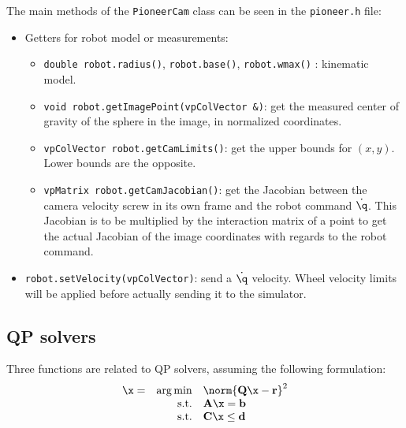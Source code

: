 \documentclass{ecnreport}
\begin{document}
The main methods of the \texttt{PioneerCam} class can be seen in the \texttt{pioneer.h} file:
\begin{itemize}
 \item Getters for robot model or measurements:
 \begin{itemize}
  \item \texttt{double robot.radius()}, \texttt{robot.base()}, \texttt{robot.wmax()} : kinematic model.
  \item \texttt{void robot.getImagePoint(vpColVector \&)}: get the measured center of gravity of the sphere in the image, in normalized coordinates.
  \item \texttt{vpColVector robot.getCamLimits()}: get the upper bounds for $(x,y)$. Lower bounds are the opposite.
  \item \texttt{vpMatrix robot.getCamJacobian()}: get the Jacobian between the camera velocity screw in its own frame and the robot command $\dot \q$. This Jacobian is to be multiplied
  by the interaction matrix of a point to get the actual Jacobian of the image coordinates with regards to the robot command.
 \end{itemize}
\item \texttt{robot.setVelocity(vpColVector)}: send a $\dot \q$ velocity. Wheel velocity limits will be applied before actually sending it to the simulator.
\end{itemize}

% 

\subsection{QP solvers}\label{qpsolvers}

Three functions are related to QP solvers, assuming the following formulation:
\begin{equation}
 \begin{array}{lrl}
  \x = & \arg \min & \norm{\mathbf{Q}\x - \mathbf{r}}^2 \\ 
  & \text{s.t.} & \mathbf A\x =  \mathbf b \\ 
  & \text{s.t.} & \mathbf C\x \leq  \mathbf d
 \end{array}
\end{equation}
\end{document}
